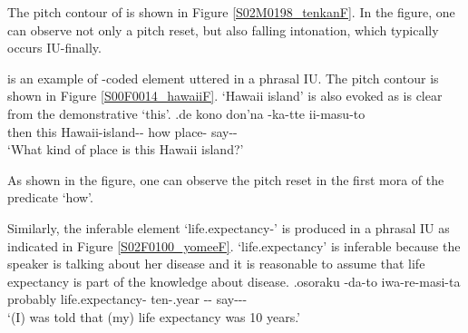 The pitch contour of \Last is shown in Figure \ref{S02M0198_tenkanF}.
In the figure,
one can observe not only a pitch reset,
but also falling intonation,
which typically occurs IU-finally.

\Next is an example of -coded element uttered in a phrasal IU.
The pitch contour is shown in Figure \ref{S00F0014_hawaiiF}.
 `Hawaii island' is also evoked
as is clear from the demonstrative  `this'.
%
\exg.\label{S00F0014_hawaii}de kono \tp{\dvline}  \tp{\dvline} don'na -ka-tte ii-masu-to \tp{\dvline} \\
		then this {} Hawaii-island-- {} how place- say-- {} \\
		`What kind of place is this Hawaii island?'

As shown in the figure,
one can observe the pitch reset in the first mora of the predicate  `how'.

Similarly,
the inferable element  `life.expectancy-' is produced in a phrasal IU as indicated in Figure \ref{S02F0100_yomeeF}.
 `life.expectancy' is inferable
because the speaker is talking about her disease and
it is reasonable to assume that life expectancy is part of the knowledge about disease.
%
\exg.\label{S02F0100_yomee}osoraku {\iub}  {\iub}  {\iub} -da-to {\iub} iwa-re-masi-ta \\
      probably {} life.expectancy- {} ten-.year {} -- {} say--- \\
      `(I) was told that (my) life expectancy was 10 years.'


